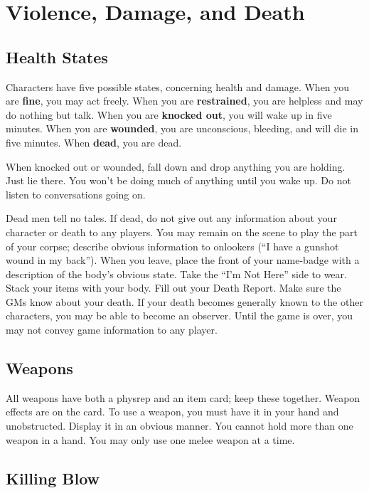 \documentclass[sheet]{airship}
\begin{document}
\section{Violence, Damage, and Death}

\subsection{Health States}

Characters have five possible states, concerning health and damage.
When you are {\bf fine}, you may act freely.  When you are {\bf
restrained}, you are helpless and may do nothing but talk.  When you are
{\bf knocked out}, you will wake up in five minutes.  When you are
{\bf wounded}, you are unconscious, bleeding, and will die in five
minutes.  When {\bf dead}, you are dead.

When knocked out or wounded, fall down and drop anything you are
holding.  Just lie there.  You won't be doing much of anything until
you wake up.  Do not listen to conversations going on.

Dead men tell no tales.  If dead, do not give out any information
about your character or death to any players.  You may remain on the
scene to play the part of your corpse; describe obvious information to
onlookers (``I have a gunshot wound in my back'').  When you leave,
place the front of your name-badge with a description of the body's
obvious state.  Take the ``I'm Not Here'' side to wear.  Stack your
items with your body.  Fill out your Death Report.  Make sure the GMs
know about your death.  If your death becomes generally known to the
other characters, you may be able to become an observer.  Until the
game is over, you may not convey game information to any player.

\subsection{Weapons}

All weapons have both a physrep and an item card; keep these together.
Weapon effects are on the card.  To use a weapon, you must have it in
your hand and unobstructed.  Display it in an obvious manner.  You
cannot hold more than one weapon in a hand.  You may only use one
melee weapon at a time.

\subsection{Killing Blow}
\end{document}
